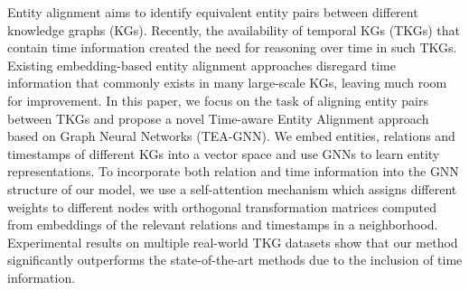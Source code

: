 Entity alignment aims to identify equivalent entity pairs between different knowledge graphs (KGs). Recently, the availability of temporal KGs (TKGs) that contain time information created the need for reasoning over time in such TKGs. Existing embedding-based entity alignment approaches disregard time information that commonly exists in many large-scale KGs, leaving much room for improvement. In this paper, we focus on the task of aligning entity pairs between TKGs and propose a novel Time-aware Entity Alignment approach based on Graph Neural Networks (TEA-GNN). We embed entities, relations and timestamps of different KGs into a vector space and use GNNs to learn entity representations. To incorporate both relation and time information into the GNN structure of our model, we use a self-attention mechanism which assigns different weights to different nodes with orthogonal transformation matrices computed from embeddings of the relevant relations and timestamps in a neighborhood. Experimental results on multiple real-world TKG datasets show that our method significantly outperforms the state-of-the-art methods due to the inclusion of time information.
